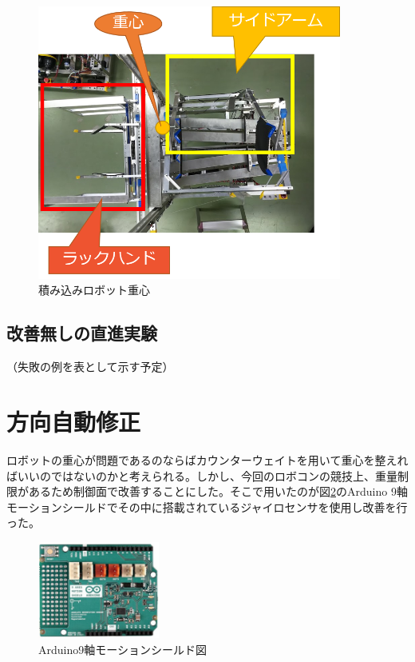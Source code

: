 \documentclass[12pt,oneside]{sotsuken_paper}
\begin{document}
		\begin{figure}[htp]
			\begin{center}
				\includegraphics[width=100mm]{Image/積込ロボット重心.png}
				\caption{積み込みロボット重心}
				\label{積込ロボット重心}
			\end{center}
		\end{figure} 

		\subsection{改善無しの直進実験}
		（失敗の例を表として示す予定）
		\label{改善無しの直進実験}

	\section{方向自動修正}
	ロボットの重心が問題であるのならばカウンターウェイトを用いて重心を整えればいいのではないのかと考えられる。しかし、今回のロボコンの競技上、重量制限があるため制御面で改善することにした。そこで用いたのが図\ref{Arduino9軸モーションシールド図}のArduino 9軸モーションシールドでその中に搭載されているジャイロセンサを使用し改善を行った。

\begin{figure}[htp]
		\begin{center}
			\includegraphics[width=40mm]{Image/Arduino9軸モーションシールド図.png}
			\caption{Arduino9軸モーションシールド図}
			\label{Arduino9軸モーションシールド図}
		\end{center}
\end{figure}
\end{document}
